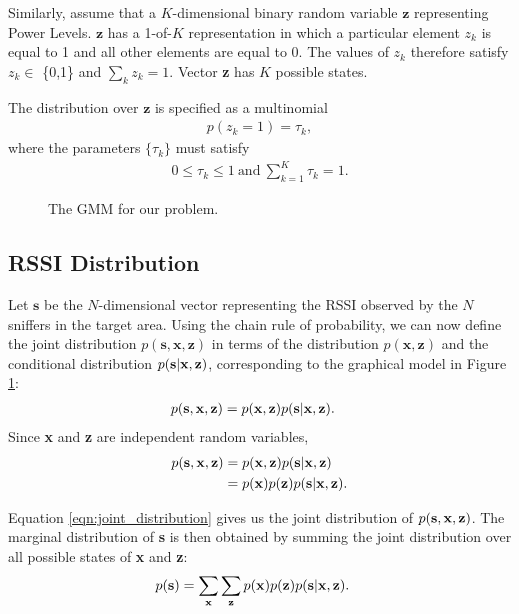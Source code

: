 Similarly, assume that a $K$-dimensional binary random variable $\mathbf{z}$ representing Power Levels. $\mathbf{z}$ has a 1-of-$K$ representation in which a particular element $z_{k}$ is equal to 1 and all other elements are equal to 0. The values of $z_{k}$ therefore satisfy $z_{k} \in$ \{0,1\} and $\sum_{k} z_{k} = 1$. Vector {\bf z} has $K$ possible states.

The distribution over $\mathbf{z}$ is specified as a multinomial 
\begin{align}
p(z_{k} = 1) = \tau_{k},
\end{align}
where the parameters $\{\tau_{k}\}$ must satisfy
\begin{align}
0 \le \tau_{k} \le 1 \ \text{and} \  \sum_{k=1}^{K} \tau_{k} = 1.
\end{align}


\begin{figure} [h!]
\centering
{}
\caption{The GMM for our problem.}
\label{fig:gmm}
\end{figure}


\subsection{RSSI Distribution}
\label{subsec:constructingthedistributionovertheobservedsignalstrengths}

Let $\mathbf{s}$ be the $N$-dimensional vector representing the RSSI observed by the $N$ sniffers in the target area. 
Using the chain rule of probability, we can now define the joint distribution $p(\mathbf{s}, \mathbf{x},\mathbf{z})$ in terms of the distribution $p(\mathbf{x},\mathbf{z})$ and the conditional distribution $p( {\bf s} | {\bf x}, {\bf z})$, 
corresponding to the graphical model in Figure \ref{fig:gmm}:
\begin{align}
p( {\bf s}, {\bf x}, {\bf z}) &= p( {\bf x}, {\bf z}) p( {\bf s} | {\bf x}, {\bf z}).
\end{align}
Since {\bf x} and {\bf z} are independent random variables,
\begin{align}
p( {\bf s}, {\bf x}, {\bf z}) &= p( {\bf x}, {\bf z}) p( {\bf s} | {\bf x}, {\bf z}) \nonumber \\
&= p({\bf x})p({\bf z})p( {\bf s} | {\bf x}, {\bf z}). \label{eqn:joint_distribution}
\end{align}

Equation \ref{eqn:joint_distribution} gives us the joint distribution of $ p( {\bf s}, {\bf x}, {\bf z}) $. The marginal distribution of {\bf s} is then obtained by summing the joint distribution over all possible states of {\bf x} and {\bf z}:
\begin{align}
p( {\bf s}) & = \sum_{\bf x}\sum_{\bf z} p({\bf x})p({\bf z})p({\bf s}|{\bf x}, {\bf z}).\label{eqn:marginal_distribution1}
\end{align}

